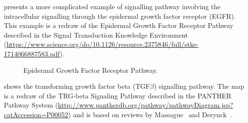  presents a more complicated example of signalling pathway involving the intracellular signalling through the epidermal growth factor receptor (EGFR).  This example is a redraw of the Epidermal Growth Factor Receptor Pathway described in the Signal Transduction Knowledge Environment (\url{https://www.science.org/do/10.1126/resource.2375846/full/stke-1714066887583.pdf}).

\begin{figure}
\begin{center}
\caption{Epidermal Growth Factor Receptor Pathway.}\label{fig:EGF}
\end{center}
\end{figure}

 shows the transforming growth factor beta (TGF$\beta$) signalling pathway.  The map is a redraw of the TRG-beta Signaling Pathway described in the PANTHER Pathway System (\url{http://www.pantherdb.org/pathway/pathwayDiagram.jsp?catAccession=P00052}) and is based on reviews by Massague~\cite{Massague:1998} and Derynck~\cite{Derynck:2001}.

